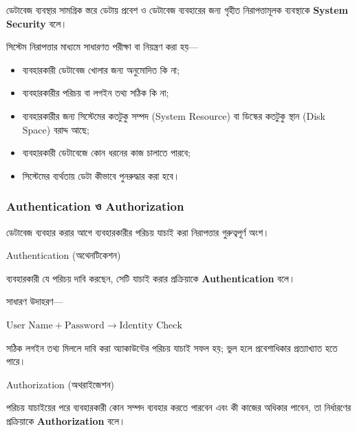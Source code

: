\begin{definitionbox}{}

ডেটাবেজ ব্যবস্থার সামগ্রিক স্তরে ডেটায় প্রবেশ ও ডেটাবেজ ব্যবহারের জন্য গৃহীত নিরাপত্তামূলক ব্যবস্থাকে \textbf{System Security} বলে।

\end{definitionbox}

সিস্টেম নিরাপত্তার মাধ্যমে সাধারণত পরীক্ষা বা নিয়ন্ত্রণ করা হয়---

\begin{itemize}
    \item ব্যবহারকারী ডেটাবেজ খোলার জন্য অনুমোদিত কি না;
    \item ব্যবহারকারীর পরিচয় বা লগইন তথ্য সঠিক কি না;
    \item ব্যবহারকারীর জন্য সিস্টেমের কতটুকু সম্পদ (System Resource) বা ডিস্কের কতটুকু স্থান (Disk Space) বরাদ্দ আছে;
    \item ব্যবহারকারী ডেটাবেজে কোন ধরনের কাজ চালাতে পারবে;
    \item সিস্টেমের ব্যর্থতায় ডেটা কীভাবে পুনরুদ্ধার করা হবে।
\end{itemize}



\subsubsection{Authentication ও Authorization}

ডেটাবেজ ব্যবহার করার আগে ব্যবহারকারীর পরিচয় যাচাই করা নিরাপত্তার
গুরুত্বপূর্ণ অংশ।

\begin{definitionbox}{Authentication (অথেনটিকেশন)}

ব্যবহারকারী যে পরিচয় দাবি করছেন, সেটি যাচাই করার প্রক্রিয়াকে \textbf{Authentication} বলে।

\end{definitionbox}

সাধারণ উদাহরণ---

\par\smallskip
\noindent\(\displaystyle \text{User Name}
+
\text{Password}
\rightarrow
\text{Identity Check}\)\par\smallskip

সঠিক লগইন তথ্য মিললে দাবি করা অ্যাকাউন্টের পরিচয় যাচাই সফল হয়;
ভুল হলে প্রবেশাধিকার প্রত্যাখ্যাত হতে পারে।

\begin{definitionbox}{Authorization (অথরাইজেশন)}

পরিচয় যাচাইয়ের পরে ব্যবহারকারী কোন সম্পদ ব্যবহার করতে পারবেন এবং কী কাজের অধিকার পাবেন, তা নির্ধারণের প্রক্রিয়াকে \textbf{Authorization} বলে।

\end{definitionbox}


